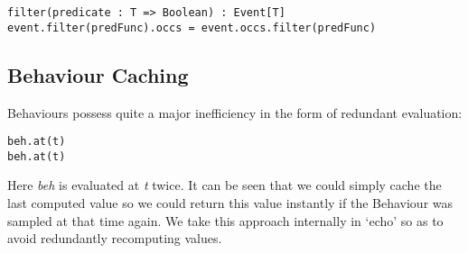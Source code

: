 \begin{verbatim}
filter(predicate : T => Boolean) : Event[T]
event.filter(predFunc).occs = event.occs.filter(predFunc)
\end{verbatim}  

    \subsection{Behaviour Caching}
      Behaviours possess quite a major inefficiency in the form of redundant evaluation:

\begin{verbatim}
beh.at(t)
beh.at(t)
\end{verbatim}  

      Here \emph{beh} is evaluated at \emph{t} twice. It can be seen that we could simply cache the last
      computed value so we could return this value instantly if the Behaviour was sampled at that time again.
      We take this approach internally in `echo' so as to avoid redundantly recomputing values. 